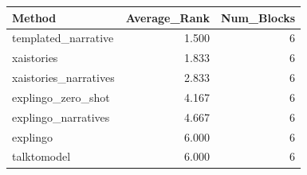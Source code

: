 \begin{tabular}{lrr}
\toprule
Method & Average_Rank & Num_Blocks \\
\midrule
templated_narrative & 1.500 & 6 \\
xaistories & 1.833 & 6 \\
xaistories_narratives & 2.833 & 6 \\
explingo_zero_shot & 4.167 & 6 \\
explingo_narratives & 4.667 & 6 \\
explingo & 6.000 & 6 \\
talktomodel & 6.000 & 6 \\
\bottomrule
\end{tabular}
